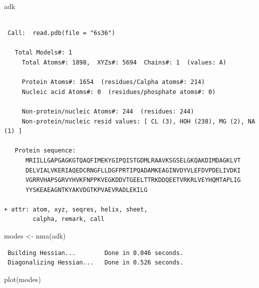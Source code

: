 \documentclass[
  letterpaper,
  DIV=11,
  numbers=noendperiod]{scrartcl}
\newenvironment{Shaded}{\begin{snugshade}}{\end{snugshade}}
\newcommand{\FunctionTok}[1]{\textcolor[rgb]{0.28,0.35,0.67}{#1}}
\newcommand{\NormalTok}[1]{\textcolor[rgb]{0.00,0.23,0.31}{#1}}
\newcommand{\OtherTok}[1]{\textcolor[rgb]{0.00,0.23,0.31}{#1}}
\begin{document}
\begin{Shaded}
\begin{Highlighting}[]
\NormalTok{adk}
\end{Highlighting}
\end{Shaded}

\begin{verbatim}

 Call:  read.pdb(file = "6s36")

   Total Models#: 1
     Total Atoms#: 1898,  XYZs#: 5694  Chains#: 1  (values: A)

     Protein Atoms#: 1654  (residues/Calpha atoms#: 214)
     Nucleic acid Atoms#: 0  (residues/phosphate atoms#: 0)

     Non-protein/nucleic Atoms#: 244  (residues: 244)
     Non-protein/nucleic resid values: [ CL (3), HOH (238), MG (2), NA (1) ]

   Protein sequence:
      MRIILLGAPGAGKGTQAQFIMEKYGIPQISTGDMLRAAVKSGSELGKQAKDIMDAGKLVT
      DELVIALVKERIAQEDCRNGFLLDGFPRTIPQADAMKEAGINVDYVLEFDVPDELIVDKI
      VGRRVHAPSGRVYHVKFNPPKVEGKDDVTGEELTTRKDDQEETVRKRLVEYHQMTAPLIG
      YYSKEAEAGNTKYAKVDGTKPVAEVRADLEKILG

+ attr: atom, xyz, seqres, helix, sheet,
        calpha, remark, call
\end{verbatim}

\begin{Shaded}
\begin{Highlighting}[]
\NormalTok{modes }\OtherTok{\textless{}{-}} \FunctionTok{nma}\NormalTok{(adk)}
\end{Highlighting}
\end{Shaded}

\begin{verbatim}
 Building Hessian...        Done in 0.046 seconds.
 Diagonalizing Hessian...   Done in 0.526 seconds.
\end{verbatim}

\begin{Shaded}
\begin{Highlighting}[]
\FunctionTok{plot}\NormalTok{(modes)}
\end{Highlighting}
\end{Shaded}
\end{document}

